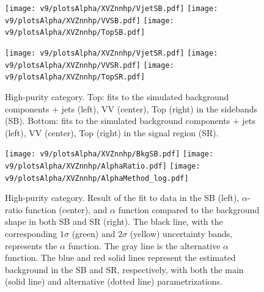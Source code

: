 \begin{figure}[!htb]
  \centering
    \texttt{[image: v9/plotsAlpha/XVZnnhp/VjetSB.pdf]}
    \texttt{[image: v9/plotsAlpha/XVZnnhp/VVSB.pdf]}
    \texttt{[image: v9/plotsAlpha/XVZnnhp/TopSB.pdf]}

    \texttt{[image: v9/plotsAlpha/XVZnnhp/VjetSR.pdf]}
    \texttt{[image: v9/plotsAlpha/XVZnnhp/VVSR.pdf]}
    \texttt{[image: v9/plotsAlpha/XVZnnhp/TopSR.pdf]}
    \caption{High-purity category. Top: fits to the simulated background components \V + jets (left), VV (center), Top (right) in the sidebands (SB). Bottom: fits to the simulated background components \V + jets (left), VV (center), Top (right) in the signal region (SR).}
  \label{fig:XVZnnhp}
\end{figure}

\begin{figure}[!htb]
  \centering
    \texttt{[image: v9/plotsAlpha/XVZnnhp/BkgSB.pdf]}
    \texttt{[image: v9/plotsAlpha/XVZnnhp/AlphaRatio.pdf]}
    \texttt{[image: v9/plotsAlpha/XVZnnhp/AlphaMethod\_log.pdf]}
  \caption{High-purity category. Result of the fit to data in the SB (left), $\alpha$-ratio function (center), and $\alpha$ function compared to the background shape in both SB and SR (right). The black line, with the corresponding $1\sigma$ (green) and $2\sigma$ (yellow) uncertainty bands, represents the $\alpha$ function. The gray line is the alternative $\alpha$ function. The blue and red solid lines represent the estimated background in the SB and SR, respectively, with both the main (solid line) and alternative (dotted line) parametrizations.}
  \label{fig:XVZnnhp_Alpha}
\end{figure}

